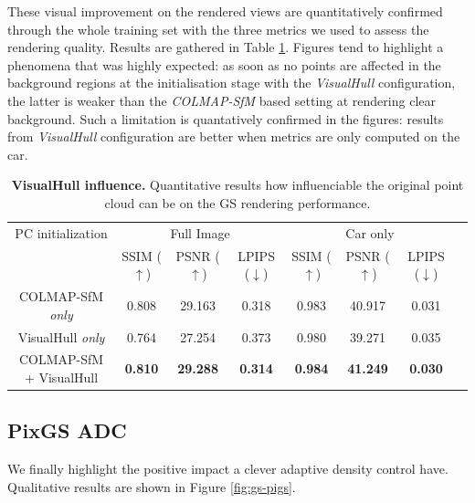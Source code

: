 These visual improvement on the rendered views are quantitatively confirmed through the whole training set with the three metrics we used to assess the rendering quality. Results are gathered in Table \ref{table:gs-vh-influence}. Figures tend to highlight a phenomena that was highly expected: as soon as no points are affected in the background regions at the initialisation stage with the \textit{VisualHull} configuration, the latter is weaker than the \textit{COLMAP-SfM} based setting at rendering clear background. Such a limitation is quantatively confirmed in the figures: results from \textit{VisualHull} configuration are better when metrics are only computed on the car. 
\begin{table}[htp!]
  \caption{\textbf{VisualHull influence.} Quantitative results how influenciable the original point cloud can be on the GS rendering performance.}
  \label{table:gs-vh-influence}
  \begin{adjustbox}{width=\linewidth}
  \begin{tabular}[h]{c||ccccccc}
  \hline
   PC initialization & \multicolumn{3}{c}{Full Image} & \multicolumn{3}{c}{Car only} \\
   &  SSIM ($\uparrow$) & PSNR ($\uparrow$) & LPIPS ($\downarrow$) & SSIM ($\uparrow$) & PSNR ($\uparrow$) & LPIPS ($\downarrow$)\\
  \hline
  COLMAP-SfM \textit{only} & 0.808 & 29.163 & 0.318 & 0.983 & 40.917 & 0.031\\
  VisualHull \textit{only} & 0.764 & 27.254 & 0.373 & 0.980 &   39.271 & 0.035 \\
  COLMAP-SfM + VisualHull & \textbf{0.810} & \textbf{29.288} & \textbf{0.314}  & \textbf{0.984} & \textbf{41.249}   & \textbf{0.030} \\
  \hline 
  \end{tabular}
  \end{adjustbox}
  \end{table}


\subsection{PixGS ADC} 

We finally highlight the  positive impact a clever adaptive density control have. Qualitative results are shown in Figure \ref{fig:gs-pigs}. 


